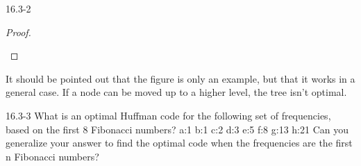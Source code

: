 \begin{problem}{16.3-2}
\begin{solution}
\begin{proof}
\begin{figure}[H]
      \end{figure}
    \end{proof}
    It should be pointed out that the figure is only an example, but that it works in a general case. If a node can be
    moved up to a higher level, the tree isn't optimal.
  \end{solution}
\end{problem}

\begin{problem}{16.3-3}
  What is an optimal Huffman code for the following set of frequencies, based on the first 8 Fibonacci numbers?
  \br
  a:1 b:1 c:2 d:3 e:5 f:8 g:13 h:21
  \br
  Can you generalize your answer to find the optimal code when the frequencies are the first n Fibonacci numbers?
\end{problem}



